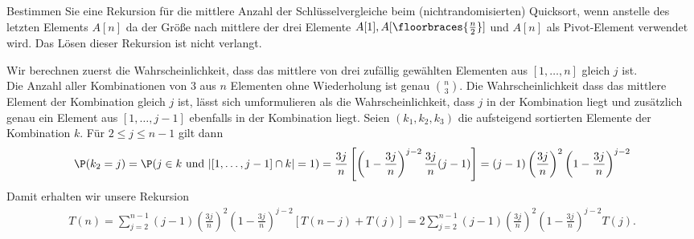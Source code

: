 
\begin{exercise}

Bestimmen Sie eine Rekursion für die mittlere Anzahl der Schlüsselvergleiche beim
(nichtrandomisierten) Quicksort, wenn anstelle des letzten Elements $A[n]$ da
der Größe nach mittlere der drei Elemente $A[1],A[\floorbraces{\frac{n}{2}}]$
und $A[n]$ als Pivot-Element verwendet wird. Das Lösen dieser Rekursion ist nicht
verlangt.

\end{exercise}



\begin{solution}

Wir berechnen zuerst die Wahrscheinlichkeit, dass das mittlere von drei zufällig
gewählten Elementen aus $[1,\dots,n]$ gleich $j$ ist. \\
Die Anzahl aller Kombinationen von $3$ aus $n$ Elementen ohne Wiederholung ist genau $\binom{n}{3}$.
Die Wahrscheinlichkeit dass das mittlere Element der Kombination gleich $j$ ist,
lässt sich umformulieren als die Wahrscheinlichkeit, dass $j$ in der Kombination liegt
und zusätzlich genau ein Element aus $[1,\dots,j-1]$ ebenfalls in der Kombination liegt.
Seien $(k_1,k_2,k_3)$ die aufsteigend sortierten Elemente der Kombination $k$.
Für $2 \leq j \leq n - 1$ gilt dann
\begin{align*}
  \P(k_2 = j) = \P(j \in k \text{ und } |[1,\dots,j-1]\cap k| = 1)
  = \frac{3j}{n}\left[\left(1- \frac{3j}{n}\right)^{j-2}\frac{3j}{n}(j-1)\right]
  =(j-1)\left(\frac{3j}{n}\right)^{2}\left(1- \frac{3j}{n}\right)^{j-2}
\end{align*}
Damit erhalten wir unsere Rekursion
\begin{align*}
  T(n) = \sum_{j=2}^{n-1}(j-1)\left(\frac{3j}{n}\right)^{2}\left(1- \frac{3j}{n}\right)^{j-2}[T(n-j) + T(j)] = 2\sum_{j=2}^{n-1}(j-1)\left(\frac{3j}{n}\right)^{2}\left(1- \frac{3j}{n}\right)^{j-2} T(j).
\end{align*}
\end{solution}


